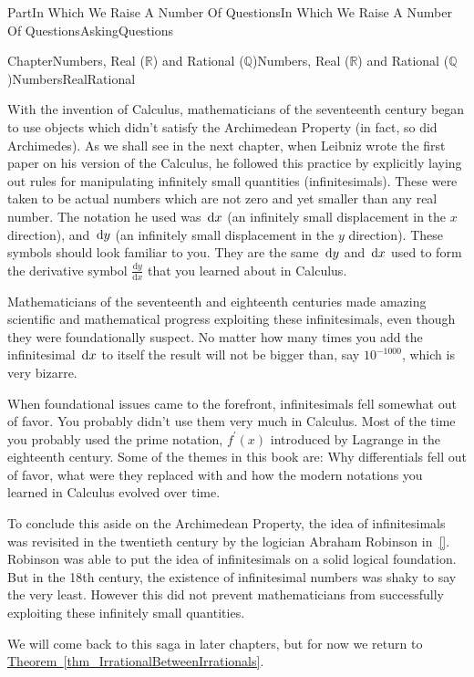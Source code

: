 \documentclass[oneside,10pt,]{book}
\newcommand{\xreffont}{\relax}
\numberwithin{equation}{part}
\newcommand{\dx}[1]{\,{\rm d}#1}
\newcommand{\dfdx}[2]{\frac{\text{d}{#1}}{\text{d}{#2}}}
\newcommand{\RR}{\mathbb {R}}
\newcommand{\QQ}{\mathbb {Q}}
\begin{document}
\begin{partptx}{Part}{In Which We Raise A Number Of Questions}{}{In Which We Raise A Number Of Questions}{}{}{AskingQuestions}
\begin{chapterptx}{Chapter}{Numbers, Real (\(\RR\)) and Rational (\(\QQ\))}{}{Numbers, Real (\(\RR\)) and Rational (\(\QQ\))}{}{}{NumbersRealRational}
\begin{introduction}{}
\par
With the invention of Calculus, mathematicians of the seventeenth century began to use objects which didn't satisfy the Archimedean Property (in fact, so did Archimedes). As we shall see in the next chapter, when Leibniz wrote the first paper on his version of the Calculus, he followed this practice by explicitly laying out rules for manipulating infinitely small quantities (infinitesimals). These were taken to be actual numbers which are not zero and yet smaller than any real number. The notation he used was \(\dx{ x}\) (an infinitely small displacement in the \(x\) direction), and \(\dx{ y}\) (an infinitely small displacement in the \(y\) direction). These symbols should look familiar to you. They are the same \(\dx{ y}\) and \(\dx{ x}\) used to form the derivative symbol \(\dfdx{y}{x}\) that you learned about in Calculus.%
\par
Mathematicians of the seventeenth and eighteenth centuries made amazing scientific and mathematical progress exploiting these infinitesimals, even though they were foundationally suspect. No matter how many times you add the infinitesimal \(\dx{ x}\) to itself the result will not be bigger than, say \(10^{-1000}\), which is very bizarre.%
\par
When foundational issues came to the forefront, infinitesimals fell somewhat out of favor. You probably didn't use them very much in Calculus. Most of the time you probably used the prime notation, \(f^\prime(x)\) introduced by Lagrange  in the eighteenth century. Some of the themes in this book are: Why differentials fell out of favor, what were they replaced with and how the modern notations you learned in Calculus evolved over time.%
\par
To conclude this aside on the Archimedean Property, the idea of infinitesimals was revisited in the twentieth century by the logician Abraham Robinson in~\hyperlink{robinson74__non_stand_analy}{[{\xreffont 12}]}. Robinson was able to put the idea of infinitesimals on a solid logical foundation. But in the 18th century, the existence of infinitesimal numbers was shaky to say the very least. However this did not prevent mathematicians from successfully exploiting these infinitely small quantities.%
\par
We will come back to this saga in later chapters, but for now we return to \hyperref[thm_IrrationalBetweenIrrationals]{Theorem~{\xreffont\ref{thm_IrrationalBetweenIrrationals}}}.%

\end{introduction}
\end{chapterptx}
\end{partptx}
\end{document}
